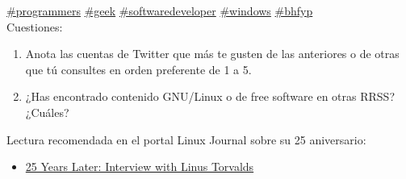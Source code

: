 \begin{center}
{{    \href{https://twitter.com/hashtag/programmers}{\#programmers}
    \href{https://twitter.com/hashtag/geek}{\#geek}
    \href{https://twitter.com/hashtag/softwaredeveloper}{\#softwaredeveloper}
    \href{https://twitter.com/hashtag/windows}{\#windows}
    \href{https://twitter.com/hashtag/bhfyp}{\#bhfyp}
    \\
    Cuestiones:
    \begin{enumerate}
    \item Anota las cuentas de Twitter que más te gusten de las anteriores o de otras que tú consultes en orden preferente de 1 a 5.
    \item ¿Has encontrado contenido GNU/Linux o de free software en otras RRSS? ¿Cuáles?
    \end{enumerate}
    Lectura recomendada en el portal Linux Journal sobre su 25 aniversario:
    \begin{itemize}
        \item \href{https://www.linuxjournal.com/content/25-years-later-interview-linus-torvalds}{25 Years Later: Interview with Linus Torvalds}
    \end{itemize}
    }}
\end{center}